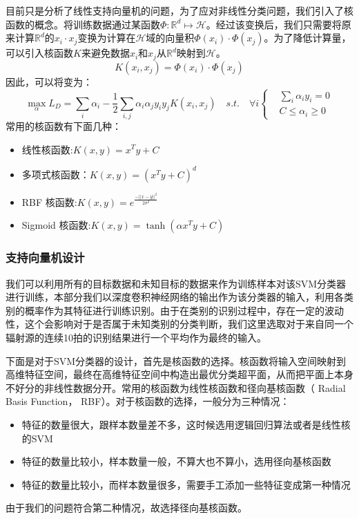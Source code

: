 目前只是分析了线性支持向量机的问题，为了应对非线性分类问题，我们引入了核函数的概念。将训练数据通过某函数$\Phi:\mathbb{R}^d\mapsto\mathcal{H}$。经过该变换后，我们只需要将原来计算$\mathbb{R}^d$的$x_i\cdot x_j$变换为计算在$\mathcal{H}$域的向量积$\Phi(x_i)\cdot\Phi(x_j)$。为了降低计算量，可以引入核函数$K$来避免数据$x_i$和$x_j$从$\mathbb{R}^d$映射到$\mathcal{H}$。
\begin{equation}
	K(x_i,x_j)=\Phi(x_i)\cdot\Phi(x_j)
\end{equation}
因此，可以将变为：
\begin{equation}
	\max \limits_{\alpha} L_D=\sum_i{\alpha_i}-\frac{1}{2}\sum_{i,j}\alpha_i\alpha_jy_iy_j K(x_i,x_j)\quad s.t. \quad \forall i
	\left\{
		\begin{aligned}
	   &\sum_i{\alpha_iy_i}=0  \\
	   &C \leq \alpha_i \geq 0
	   \end{aligned}
		\right.
\end{equation}
常用的核函数有下面几种：
\begin{itemize}
	\item 线性核函数:$K(x,y)=x^Ty+C$
	\item 多项式核函数：$K(x,y)=(x^Ty+C)^d$
	\item RBF 核函数:$K(x,y)=e^{\frac{-||x-y||^2}{2\sigma^2}}$
	\item Sigmoid 核函数:$K(x,y)=\tanh(\alpha x^Ty+C)$
\end{itemize}
\subsubsection{支持向量机设计}
我们可以利用所有的目标数据和未知目标的数据来作为训练样本对该SVM分类器进行训练，本部分我们以深度卷积神经网络的输出作为该分类器的输入，利用各类别的概率作为其特征进行训练识别。由于在类别的识别过程中，存在一定的波动性，这个会影响对于是否属于未知类别的分类判断，我们这里选取对于来自同一个辐射源的连续10拍的识别结果进行一个平均作为最终的输入。

下面是对于SVM分类器的设计，首先是核函数的选择。核函数将输入空间映射到高维特征空间，最终在高维特征空间中构造出最优分类超平面，从而把平面上本身不好分的非线性数据分开。常用的核函数为线性核函数和径向基核函数（ Radial Basis Function， RBF）。对于核函数的选择，一般分为三种情况：
\begin{itemize}
	\item  特征的数量很大，跟样本数量差不多，这时候选用逻辑回归算法或者是线性核的SVM
	\item  特征的数量比较小，样本数量一般，不算大也不算小，选用径向基核函数
	\item  特征的数量比较小，而样本数量很多，需要手工添加一些特征变成第一种情况
\end{itemize}
由于我们的问题符合第二种情况，故选择径向基核函数。

